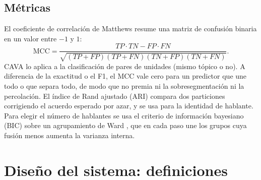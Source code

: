 \subsection{Métricas}
El coeficiente de correlación de Matthews \cite{matthews1975comparison} resume una matriz de
confusión binaria en un valor entre $-1$ y $1$:
\begin{equation}
  \mathrm{MCC} = \frac{TP\cdot TN - FP\cdot FN}
  {\sqrt{(TP+FP)(TP+FN)(TN+FP)(TN+FN)}}.
\end{equation}
CAVA lo aplica a la clasificación de pares de unidades (mismo tópico o no). A diferencia de la
exactitud o el F1, el MCC vale cero para un predictor que une todo o que separa todo, de modo
que no premia ni la sobresegmentación ni la percolación. El índice de Rand ajustado (ARI)
\cite{hubert1985comparing} compara dos particiones corrigiendo el acuerdo esperado por azar, y
se usa para la identidad de hablante. Para elegir el número de hablantes se usa el criterio de
información bayesiano (BIC) \cite{schwarz1978estimating} sobre un agrupamiento de Ward
\cite{ward1963hierarchical}, que en cada paso une los grupos cuya fusión menos aumenta la
varianza interna.

\section{Diseño del sistema: definiciones}

